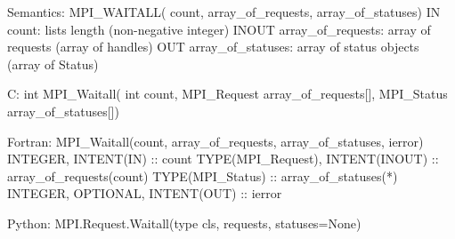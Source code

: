 Semantics:
MPI_WAITALL( count, array_of_requests, array_of_statuses)
IN count: lists length (non-negative integer)
INOUT array_of_requests: array of requests (array of handles)
OUT array_of_statuses: array of status objects (array of Status)

C:
int MPI_Waitall(
    int count, MPI_Request array_of_requests[], MPI_Status array_of_statuses[])

Fortran:
MPI_Waitall(count, array_of_requests, array_of_statuses, ierror)
INTEGER, INTENT(IN) :: count
TYPE(MPI_Request), INTENT(INOUT) :: array_of_requests(count)
TYPE(MPI_Status) :: array_of_statuses(*)
INTEGER, OPTIONAL, INTENT(OUT) :: ierror

Python:
MPI.Request.Waitall(type cls, requests, statuses=None)
